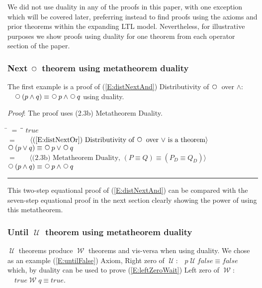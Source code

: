 \documentclass[12pt, fleqn, leqno]{article}
\newcommand{\lgap}{2pt}                             %
\newcommand{\mymathindent}{24pt}                    %
\newcommand{\Until}{\;\mathcal{U}\;}
\newcommand{\Wait}{\;\mathcal{W}\;}
\newcommand{\Next}{\;\,\text{\raisebox{3.5pt}{\circle{6}}}}
\newcommand{\myqed}{\rule[-.23ex]{1.2ex}{2.0ex}}
\newcommand{\myqedtab}{\hspace{384pt}}              %
\newcommand{\Gll} {\langle}                         %
\newcommand{\Ggg} {\rangle}                         %
\newcommand{\Hint}[1]     {\ \ \ $\Gll              \mbox{#1} \Ggg$ }   %
\begin{document}
We did not use duality in any of the proofs in this paper, with one exception which will be covered later,
preferring instead to find proofs using the axioms and prior theorems within the expanding LTL model.
Nevertheless, for illustrative purposes we show proofs using duality for one theorem from each operator section of
the paper.

\subsubsection*{Next $\Next$ theorem using metatheorem duality}\label{section-duality-next}

The first example is a proof of (\ref{E:distNextAnd})
Distributivity of $\Next$ over $\land$:$\quad \Next (p \land q) \equiv \Next p \land \Next q$
using duality.

\emph{Proof}: The proof uses (2.3b) Metatheorem Duality.
\begin{tabbing}
\hspace{\mymathindent} \= $= \;$ \= \myqedtab \= \kill
  \> \>   $true$\\[\lgap]
  \> $=$  \>  \Hint{(\ref{E:distNextOr}) Distributivity of $\Next$ over $\lor$ is a theorem}\\[\lgap]
  \> \>   $\Next (p \lor q) \equiv \Next p \lor \Next q$\\[\lgap]
    \> $=$  \>  \Hint{(2.3b) Metatheorem Duality, $(P \equiv Q) \equiv (P_D \equiv Q_D)$}\\[\lgap]
    \> \>   $\Next (p \land q) \equiv \Next p \land \Next q$ \quad \myqed
\end{tabbing}

This two-step equational proof of (\ref{E:distNextAnd}) can be compared with the seven-step equational proof
 in the next section clearly showing the power of using this metatheorem.
 
 
 \subsubsection*{Until $\Until$ theorem using metatheorem duality}\label{section-duality-until}
 
 $\Until$ theorems produce $\Wait$ theorems and vis-versa when using duality. We chose as an example
 (\ref{E:untilFalse}) Axiom, Right zero of $\Until$:$\quad p \Until false \equiv false$ which, by duality can be used
 to prove (\ref{E:leftZeroWait}) Left zero of $\Wait$: $\quad true \Wait q \equiv true$.
 
\end{document}

